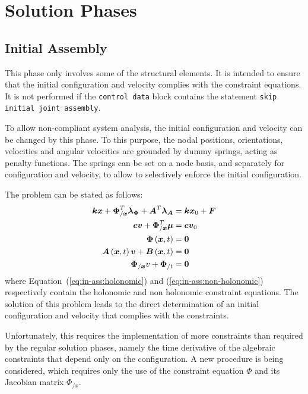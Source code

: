 \documentclass[10pt,dvips]{report}
\newcommand{\T}[1]{\boldsymbol{#1}}
\begin{document}
\chapter{Solution Phases}
\section{Initial Assembly}
This phase only involves some of the structural elements.
It is intended to ensure that the initial configuration and velocity 
complies with the constraint equations.
It is not performed if the \texttt{control data} block contains 
the statement \texttt{skip initial joint assembly}.

To allow non-compliant system analysis, the initial configuration 
and velocity can be changed by this phase.
To this purpose, the nodal positions, orientations, velocities
and angular velocities are grounded by dummy springs, acting 
as penalty functions.
The springs can be set on a node basis, and separately 
for configuration and velocity, to allow to selectively enforce 
the initial configuration.

The problem can be stated as follows:
\begin{align}
	\T{k} \T{x} + \T{\Phi}_{/\T{x}}^T \T{\lambda}_{\T{\Phi}} + \T{A}^T \T{\lambda}_{\T{A}}
		& = \T{k} \T{x}_0 + \T{F} \\
	\T{c} \T{v} + \T{\Phi}_{/\T{x}}^T \T{\mu} & = \T{c} \T{v}_0 \\
	\T{\Phi}\plbr{\T{x}, t} & = \T{0} \label{eq:in-ass:holonomic} \\
	\T{A}\plbr{\T{x}, t} \T{v} + \T{B}\plbr{\T{x}, t} & = \T{0} \label{eq:in-ass:non-holonomic} \\
	\T{\Phi}_{/\T{x}} v + \T{\Phi}_{/t} & = \T{0}
\end{align}
where Equation~(\ref{eq:in-ass:holonomic}) and (\ref{eq:in-ass:non-holonomic})
respectively contain the holonomic and non holonomic constraint equations.
The solution of this problem leads to the direct determination
of an initial configuration and velocity that complies 
with the constraints.

Unfortunately, this requires the implementation of more constraints
than required by the regular solution phases, namely the time derivative
of the algebraic constraints that depend only on the configuration.
A new procedure is being considered, which requires only the use 
of the constraint equation $\Phi$ and its Jacobian matrix $\Phi_{/x}$.
\end{document}
